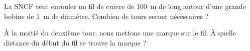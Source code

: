     La SNCF veut enrouler un fil de cuivre de \SI{100}{\meter} de long autour d'une grande bobine de \SI{1}{\meter} de diamètre. Combien de tours seront nécessaires ?

    À la moitié du deuxième tour, nous mettons une marque sur le fil. À quelle distance du début du fil se trouve la marque ?

